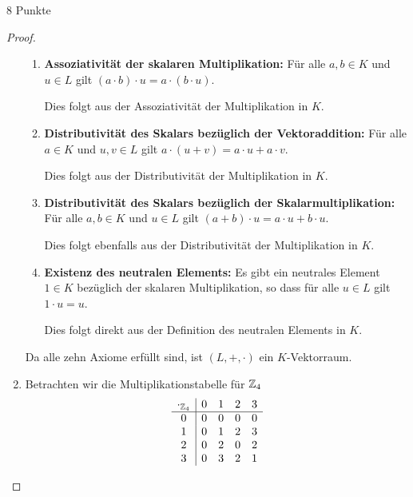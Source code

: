 \documentclass{problemset}
\begin{document}
\begin{problem}{8 Punkte}
\begin{proof}
\begin{enumerate}
\begin{enumerate}
                  \item \textbf{Assoziativität der skalaren Multiplikation:} Für alle $a, b \in K$ und $u \in L$ gilt $(a \cdot b) \cdot u = a \cdot (b \cdot u)$.

                        Dies folgt aus der Assoziativität der Multiplikation in
                        $K$.

                  \item \textbf{Distributivität des Skalars bezüglich der Vektoraddition:} Für alle $a \in K$ und $u, v \in L$ gilt $a \cdot (u + v) = a \cdot u + a \cdot v$.

                        Dies folgt aus der Distributivität der Multiplikation
                        in $K$.

                  \item \textbf{Distributivität des Skalars bezüglich der Skalarmultiplikation:} Für alle $a, b \in K$ und $u \in L$ gilt $(a + b) \cdot u = a \cdot u + b \cdot u$.

                        Dies folgt ebenfalls aus der Distributivität der
                        Multiplikation in $K$.

                  \item \textbf{Existenz des neutralen Elements:} Es gibt ein neutrales Element $1 \in K$ bezüglich der skalaren Multiplikation, so dass für alle $u \in L$ gilt $1 \cdot u = u$.

                        Dies folgt direkt aus der Definition des neutralen
                        Elements in $K$.
              \end{enumerate}

              Da alle zehn Axiome erfüllt sind, ist $(L, +, \cdot)$ ein
              $K$-Vektorraum.

        \item Betrachten wir die Multiplikationstabelle für $\mathbb{Z}_4$
              \[
                  \begin{array}{c|cccc}
                      \cdot_{\mathbb{Z}_4} & 0 & 1 & 2 & 3 \\
                      \hline
                      0                   & 0 & 0 & 0 & 0 \\
                      1                   & 0 & 1 & 2 & 3 \\
                      2                   & 0 & 2 & 0 & 2 \\
                      3                   & 0 & 3 & 2 & 1 \\
                  \end{array}
              \]


\end{enumerate}
\end{proof}
\end{problem}
\end{document}
